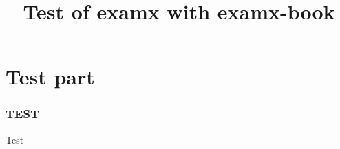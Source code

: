 \documentclass{examx}
\title{Test of examx with examx-book}
\begin{document}
    \tableofcontents
    \part{Test part}
    \section{TEST}
    Test
\end{document}

